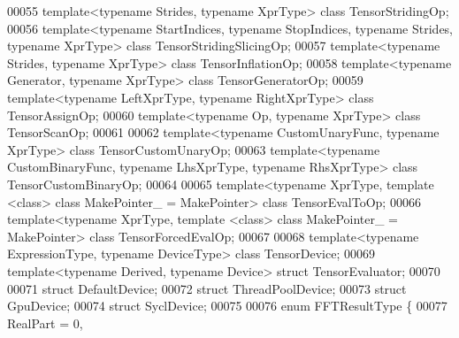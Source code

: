 \begin{DoxyCode}
00055 \textcolor{keyword}{template}<\textcolor{keyword}{typename} Str\textcolor{keywordtype}{id}es, \textcolor{keyword}{typename} XprType> \textcolor{keyword}{class }TensorStridingOp;
00056 \textcolor{keyword}{template}<\textcolor{keyword}{typename} StartIndices, \textcolor{keyword}{typename} StopIndices, \textcolor{keyword}{typename} Str\textcolor{keywordtype}{id}es, \textcolor{keyword}{typename} XprType> \textcolor{keyword}{class }
      TensorStridingSlicingOp;
00057 \textcolor{keyword}{template}<\textcolor{keyword}{typename} Str\textcolor{keywordtype}{id}es, \textcolor{keyword}{typename} XprType> \textcolor{keyword}{class }TensorInflationOp;
00058 \textcolor{keyword}{template}<\textcolor{keyword}{typename} Generator, \textcolor{keyword}{typename} XprType> \textcolor{keyword}{class }TensorGeneratorOp;
00059 \textcolor{keyword}{template}<\textcolor{keyword}{typename} LeftXprType, \textcolor{keyword}{typename} RightXprType> \textcolor{keyword}{class }TensorAssignOp;
00060 \textcolor{keyword}{template}<\textcolor{keyword}{typename} Op, \textcolor{keyword}{typename} XprType> \textcolor{keyword}{class }TensorScanOp;
00061 
00062 \textcolor{keyword}{template}<\textcolor{keyword}{typename} CustomUnaryFunc, \textcolor{keyword}{typename} XprType> \textcolor{keyword}{class }TensorCustomUnaryOp;
00063 \textcolor{keyword}{template}<\textcolor{keyword}{typename} CustomBinaryFunc, \textcolor{keyword}{typename} LhsXprType, \textcolor{keyword}{typename} RhsXprType> \textcolor{keyword}{class }TensorCustomBinaryOp;
00064 
00065 \textcolor{keyword}{template}<\textcolor{keyword}{typename} XprType, \textcolor{keyword}{template} <\textcolor{keyword}{class}> \textcolor{keyword}{class }MakePointer\_ = MakePointer> \textcolor{keyword}{class }TensorEvalToOp;
00066 \textcolor{keyword}{template}<\textcolor{keyword}{typename} XprType, \textcolor{keyword}{template} <\textcolor{keyword}{class}> \textcolor{keyword}{class }MakePointer\_ = MakePointer> \textcolor{keyword}{class }TensorForcedEvalOp;
00067 
00068 \textcolor{keyword}{template}<\textcolor{keyword}{typename} ExpressionType, \textcolor{keyword}{typename} DeviceType> \textcolor{keyword}{class }TensorDevice;
00069 \textcolor{keyword}{template}<\textcolor{keyword}{typename} Derived, \textcolor{keyword}{typename} Device> \textcolor{keyword}{struct }TensorEvaluator;
00070 
00071 \textcolor{keyword}{struct }DefaultDevice;
00072 \textcolor{keyword}{struct }ThreadPoolDevice;
00073 \textcolor{keyword}{struct }GpuDevice;
00074 \textcolor{keyword}{struct }SyclDevice;
00075 
00076 \textcolor{keyword}{enum} FFTResultType \{
00077   RealPart = 0,

\end{DoxyCode}
